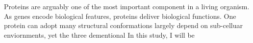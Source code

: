 Proteins are arguably one of the most important component in a living organism. As genes encode biological features, proteins deliver biological functions. One protein can adopt many structural conformations largely depend on sub-celluar enviornments, yet the three dementional      In this study, I will be 